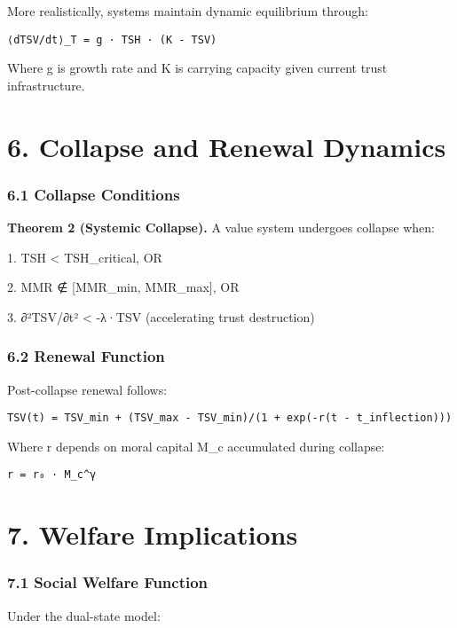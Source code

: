 \documentclass[11pt,oneside]{book}
\begin{document}
More realistically, systems maintain dynamic equilibrium through:

\begin{verbatim}
⟨dTSV/dt⟩_T = g · TSH · (K - TSV)
\end{verbatim}

Where g is growth rate and K is carrying capacity given current trust infrastructure.

\section{6. Collapse and Renewal Dynamics}

\subsubsection{6.1 Collapse Conditions}

\textbf{Theorem 2 (Systemic Collapse).} A value system undergoes collapse when:


1. TSH < TSH\_critical, OR


2. MMR ∉ [MMR\_min, MMR\_max], OR


3. ∂²TSV/∂t² < -λ·TSV (accelerating trust destruction)


\subsubsection{6.2 Renewal Function}

Post-collapse renewal follows:

\begin{verbatim}
TSV(t) = TSV_min + (TSV_max - TSV_min)/(1 + exp(-r(t - t_inflection)))
\end{verbatim}

Where r depends on moral capital M\_c accumulated during collapse:

\begin{verbatim}
r = r₀ · M_c^γ
\end{verbatim}

\section{7. Welfare Implications}

\subsubsection{7.1 Social Welfare Function}

Under the dual-state model:
\end{document}
